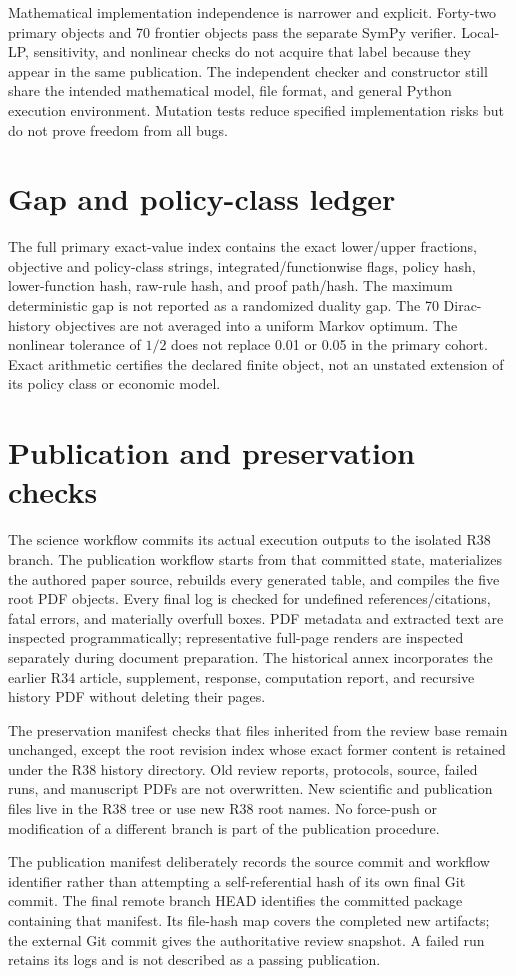 Mathematical implementation independence is narrower and explicit. Forty-two primary objects and 70 frontier objects pass the separate SymPy verifier. Local-LP, sensitivity, and nonlinear checks do not acquire that label because they appear in the same publication. The independent checker and constructor still share the intended mathematical model, file format, and general Python execution environment. Mutation tests reduce specified implementation risks but do not prove freedom from all bugs.

\section{Gap and policy-class ledger}


The full primary exact-value index contains the exact lower/upper fractions, objective and policy-class strings, integrated/functionwise flags, policy hash, lower-function hash, raw-rule hash, and proof path/hash. The maximum deterministic gap is not reported as a randomized duality gap. The 70 Dirac-history objectives are not averaged into a uniform Markov optimum. The nonlinear tolerance of $1/2$ does not replace 0.01 or 0.05 in the primary cohort. Exact arithmetic certifies the declared finite object, not an unstated extension of its policy class or economic model.

\section{Publication and preservation checks}
The science workflow commits its actual execution outputs to the isolated R38 branch. The publication workflow starts from that committed state, materializes the authored paper source, rebuilds every generated table, and compiles the five root PDF objects. Every final log is checked for undefined references/citations, fatal errors, and materially overfull boxes. PDF metadata and extracted text are inspected programmatically; representative full-page renders are inspected separately during document preparation. The historical annex incorporates the earlier R34 article, supplement, response, computation report, and recursive history PDF without deleting their pages.

The preservation manifest checks that files inherited from the review base remain unchanged, except the root revision index whose exact former content is retained under the R38 history directory. Old review reports, protocols, source, failed runs, and manuscript PDFs are not overwritten. New scientific and publication files live in the R38 tree or use new R38 root names. No force-push or modification of a different branch is part of the publication procedure.

The publication manifest deliberately records the source commit and workflow identifier rather than attempting a self-referential hash of its own final Git commit. The final remote branch HEAD identifies the committed package containing that manifest. Its file-hash map covers the completed new artifacts; the external Git commit gives the authoritative review snapshot. A failed run retains its logs and is not described as a passing publication.

